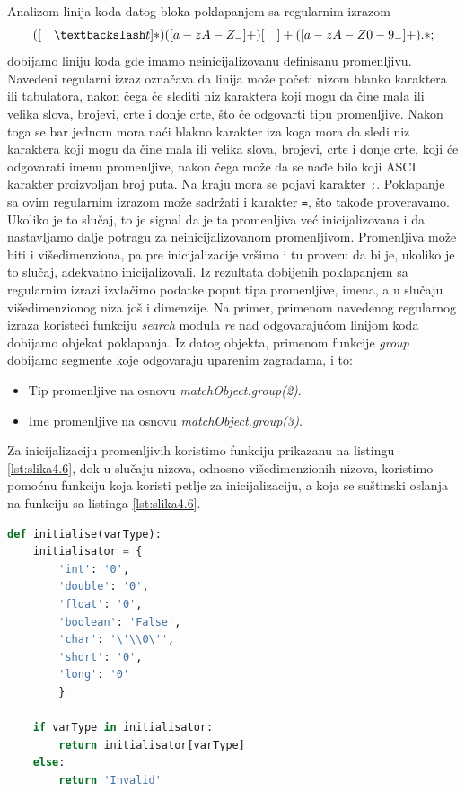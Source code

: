 \documentclass[12pt,oneside]{memoir}
\theoremstyle{plain}
\theoremstyle{definition}
\begin{document}
Analizom linija koda datog bloka poklapanjem sa regularnim izrazom 
$$ ([\quad\textbackslash t]*)([a-zA-Z_-]+)[\quad]+([a-zA-Z0-9_-]+).*; $$
dobijamo liniju koda gde imamo neinicijalizovanu definisanu promenljivu. Navedeni regularni izraz označava da linija može početi nizom blanko karaktera ili tabulatora, nakon čega će slediti niz karaktera koji mogu da čine mala ili velika slova, brojevi, crte i donje crte, što će odgovarti tipu promenljive. Nakon toga se bar jednom mora naći blakno karakter iza koga mora da sledi niz karaktera koji mogu da čine mala ili velika slova, brojevi, crte i donje crte, koji će odgovarati imenu promenljive, nakon čega može da se nađe bilo koji ASCI karakter proizvoljan broj puta. Na kraju mora se pojavi karakter \texttt{;}. Poklapanje sa ovim regularnim izrazom može sadržati i karakter \texttt{=}, što takođe proveravamo. Ukoliko je to slučaj, to je signal da je ta promenljiva već inicijalizovana i da nastavljamo dalje potragu za neinicijalizovanom promenljivom. Promenljiva može biti i višedimenziona, pa pre inicijalizacije vršimo i tu proveru da bi je, ukoliko je to slučaj, adekvatno inicijalizovali. Iz rezultata dobijenih poklapanjem sa regularnim izrazi izvlačimo podatke poput tipa promenljive, imena, a u slučaju višedimenzionog niza još i dimenzije. Na primer, primenom navedenog regularnog izraza koristeći funkciju \textit{search} modula \textit{re} nad odgovarajućom linijom koda dobijamo objekat poklapanja. Iz datog objekta, primenom funkcije \textit{group} dobijamo segmente koje odgovaraju uparenim zagradama, i to:
\begin{itemize}
\item Tip promenljive na osnovu \textit{matchObject.group(2)}.
\item Ime promenljive na osnovu \textit{matchObject.group(3)}.
\end{itemize} 
Za inicijalizaciju promenljivih koristimo funkciju prikazanu na listingu \ref{lst:slika4.6}, dok u slučaju nizova, odnosno višedimenzionih nizova, koristimo pomoćnu funkciju koja koristi petlje za inicijalizaciju, a koja se suštinski oslanja na funkciju sa listinga \ref{lst:slika4.6}.

\begin{lstlisting}[style=mystyle,caption={Funkcija inicijalizacije}, label={lst:slika4.6},language={Python}] 
def initialise(varType):
	initialisator = {
		'int': '0',
		'double': '0',
		'float': '0',
		'boolean': 'False',
		'char': '\'\\0\'',
		'short': '0',
		'long': '0'
	    }
	
	if varType in initialisator:
		return initialisator[varType]
	else:
		return 'Invalid'
\end{lstlisting}
\end{document}

